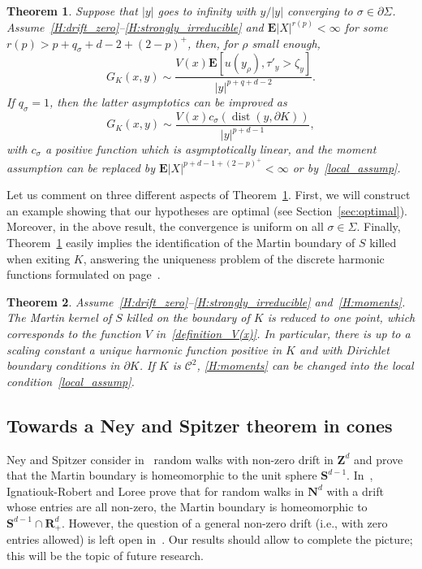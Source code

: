 \documentclass[10pt]{amsart}
\newtheorem{theo}{Theorem}[section]
\theoremstyle{definition}\newtheorem{defi}[theo]{Definition}\newtheorem{rema}[theo]{Remark}\newtheorem{exam}[theo]{Example}\newtheorem{exem}[theo]{Example}\newtheorem{nota}[theo]{Notation}
\DeclareMathOperator{\dist}{dist}
\newcommand{\clC}{\mathcal{C}}
\newcommand{\e}{\mathbf{E}}
\newcommand{\bfS}{\mathbf{S}}
\newcommand{\bfR}{\mathbf{R}}
\newcommand{\bfZ}{\mathbf{Z}}
\newcommand{\bfN}{\mathbf{N}}
\begin{document}
\begin{theo}\label{thm:asymp_Green_boundary}
Suppose that $| y|$ goes to infinity with $y/| y|$ converging to $\sigma\in \partial \Sigma$. Assume~\eqref{H:drift_zero}--\eqref{H:strongly_irreducible} and $\e| X|^{r(p)}<\infty$ for some $r(p)>p+q_{\sigma}+d-2+(2-p)^{+}$, then, for $\rho$ small enough,
\[
G_K(x,y)\sim \frac{V(x) \e\left[u(y_{\rho}),\tau'_{y}>\zeta_{y}\right]}{| y|^{p+q+d-2}}.
\]
If $q_{\sigma}=1$, then the latter asymptotics can be improved as
\[
G_K(x,y)\sim \frac{V(x)c_{\sigma}\left(\dist(y,\partial K)\right)}{| y|^{p+d-1}},
\]
with $c_{\sigma}$ a positive function which is asymptotically linear, and the moment assumption can be replaced by $\e| X|^{p+d-1+(2-p)^{+}}<\infty$ or by~\eqref{local_assump}.
\end{theo}


Let us comment on three different aspects of Theorem~\ref{thm:asymp_Green_boundary}. First, we will construct an example showing that our hypotheses are optimal (see Section~\ref{sec:optimal}). Moreover, in the above result, the convergence is uniform on all $\sigma\in \Sigma$. Finally, Theorem~\ref{thm:asymp_Green_boundary} easily implies the identification of the Martin boundary of $S$ killed when exiting ${K}$, answering the uniqueness problem of the discrete harmonic functions formulated on page~\pageref{page:problem}.

\begin{theo}\label{thm:Martin_boundary}
Assume~\eqref{H:drift_zero}--\eqref{H:strongly_irreducible} and~\eqref{H:moments}. The Martin kernel of $S$ killed on the boundary of ${K}$ is reduced to one point, which corresponds to the function $V$ in~\eqref{definition_V(x)}. In particular, there is up to a scaling constant a unique harmonic function positive in $K$ and with Dirichlet boundary conditions in $\partial K$. If $K$ is $\clC^{2}$, \eqref{H:moments} can be changed into the local condition~\eqref{local_assump}.
\end{theo}



\subsection*{Towards a Ney and Spitzer theorem in cones}

Ney and Spitzer consider in~\cite{NeSp-66} random walks with non-zero drift in $\bfZ^d$ and prove that the Martin boundary is homeomorphic to the unit sphere $\bfS^{d-1}$. In~\cite{IRLo-10,IR-09}, Ignatiouk-Robert and Loree prove that for random walks in $\bfN^d$ with a drift whose entries are all non-zero, the Martin boundary is homeomorphic to $\bfS^{d-1}\cap \bfR_+^d$. However, the question of a general non-zero drift (i.e., with zero entries allowed) is left open in~\cite{IRLo-10,IR-09}. Our results should allow to complete the picture; this will be the topic of future research.
\end{document}
